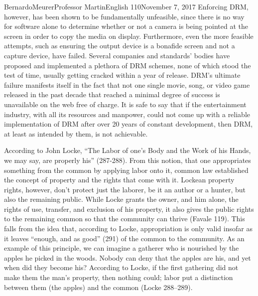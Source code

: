 \documentclass[12pt,letterpaper]{article}
\begin{document}
\begin{mla}{Bernardo}{Meurer}{Professor Martin}{English 110}{November 7, 2017}
        Enforcing DRM, however, has been shown to be fundamentally unfeasible, since there is no way for software alone to determine whether or not a camera is being pointed at the screen in order to copy the media on display. Furthermore, even the more feasible attempts, such as ensuring the output device is a bonafide screen and not a capture device, have failed. Several companies and standards' bodies have proposed and implemented a plethora of DRM schemes, none of which stood the test of time, usually getting cracked within a year of release. DRM's ultimate failure manifests itself in the fact that not one single movie, song, or video game released in the past decade that reached a minimal degree of success is unavailable on the web free of charge. It is safe to say that if the entertainment industry, with all its resources and manpower, could not come up with a reliable implementation of DRM after over 20 years of constant development, then DRM, at least as intended by them, is not achievable.

        According to John Locke, ``The Labor of one's Body and the Work of his Hands, we may say, are properly his'' (287-288). From this notion, that one appropriates something from the common by applying labor onto it, common law established the concept of property and the rights that come with it. Lockean property rights, however, don't protect just the laborer, be it an author or a hunter, but also the remaining public. While Locke grants the owner, and him alone, the rights of use, transfer, and exclusion of his property, it also gives the public rights to the remaining common so that the community can thrive (Favale 119). This falls from the idea that, according to Locke, appropriation is only valid insofar as it leaves ``enough, and as good'' (291) of the common to the community. As an example of this principle, we can imagine a gatherer who is nourished by the apples he picked in the woods. Nobody can deny that the apples are his, and yet when did they become his? According to Locke, if the first gathering did not make them the man's property, then nothing could; labor put a distinction between them (the apples) and the common (Locke 288--289).


\end{mla}
\end{document}
